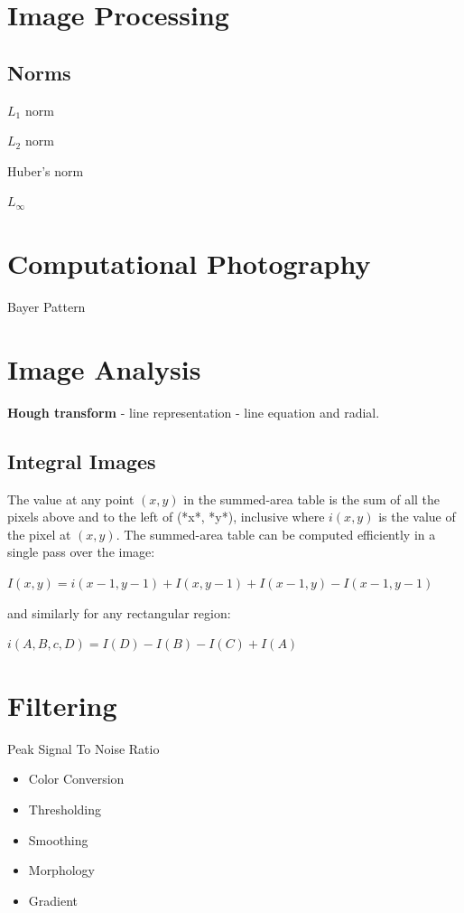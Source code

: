 \section{Image Processing}

\subsection{Norms}

$L_1$ norm

$L_2$ norm

Huber’s norm

$L_\infty $

\section{Computational Photography}

Bayer Pattern


\section{Image Analysis}

\textbf{Hough transform} - line representation - line equation and radial.

\subsection{Integral Images}

The value at any point $(x, y)$ in the summed-area table is the sum of all the pixels above and to the left of (*x*, *y*), inclusive where $i(x,y)$  is the value of the pixel at $(x,y)$. The summed-area table can be computed efficiently in a single pass over the image:

$I(x,y) = i(x-1,y-1) + I(x,y-1) + I(x-1,y)-I(x-1,y-1)$

and similarly for any rectangular region:

$ i(A,B,c,D) = I(D) - I(B) - I(C)+I(A)$

\section{ Filtering}

Peak Signal To Noise Ratio 

\begin{itemize}
\item Color Conversion
\item Thresholding
\item Smoothing
\item Morphology
\item Gradient
\end{itemize}


